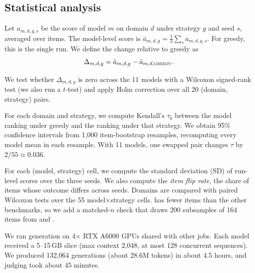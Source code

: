 

\subsection{Statistical analysis}
\label{sec:stats}
Let $a_{m,d,g,s}$ be the score of model $m$ on domain $d$ under strategy $g$ and seed $s$, averaged over items. The model-level score is $\bar a_{m,d,g} = \frac{1}{3}\sum_s a_{m,d,g,s}$. For greedy, this is the single run. We define the change relative to greedy as
\begin{equation}
\Delta_{m,d,g} = \bar a_{m,d,g} - \bar a_{m,d,\textsc{greedy}}.
\end{equation}

 We test whether $\Delta_{m,d,g}$ is zero across the 11 models with a Wilcoxon signed-rank test (we also run a $t$-test) and apply Holm correction over all 20 (domain, strategy) pairs.

 For each domain and strategy, we compute Kendall's $\tau_b$ between the model ranking under greedy and the ranking under that strategy. We obtain 95\% confidence intervals from 1{,}000 item-bootstrap resamples, recomputing every model mean in each resample. With 11 models, one swapped pair changes $\tau$ by $2/55\approx0.036$.

 For each (model, strategy) cell, we compute the standard deviation (SD) of run-level scores over the three seeds. We also compute the \emph{item flip rate}, the share of items whose outcome differs across seeds. Domains are compared with paired Wilcoxon tests over the 55 model$\times$strategy cells. \humaneval has fewer items than the other benchmarks, so we add a matched-$n$ check that draws 200 subsamples of 164 items from \triviaqa and \gsm.

 We ran generation on 4$\times$ RTX A6000 GPUs shared with other jobs. Each model received a 5--15\,GB slice (max context 2{,}048, at most 128 concurrent sequences). We produced 132{,}064 generations (about 28.6M tokens) in about 4.5 hours, and judging took about 45 minutes.
